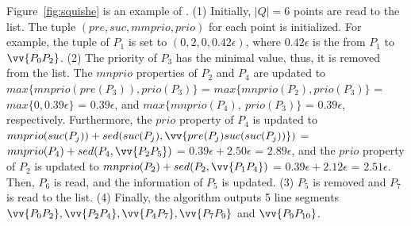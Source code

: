 \begin{example}
\label{exm-alg-squishe}
Figure~\ref{fig:squishe} is an example of \squishe.
%
(1) Initially, $|Q| = 6$ points are read to the list. The tuple $(pre, suc, mmprio, prio)$ for each point is initialized. For example, the tuple of $P_1$ is set to $(0, 2, 0, 0.42\epsilon)$, where $0.42\epsilon$ is the \sed from $P_1$ to $\vv{P_0P_2}$.
%
(2) The priority of $P_3$ has the minimal value, thus, it is removed from the list.
The $mnprio$ properties of $P_2$ and $P_4$ are updated to $max\{mnprio(pre(P_3)), prio(P_3)\}$ = $max\{mnprio(P_2), prio(P_3)\}$ = $max\{0, 0.39\epsilon\}$ = $0.39\epsilon$, and $max\{mnprio(P_4), ~prio(P_3)\}$ = $0.39\epsilon$, respectively.
Furthermore, the $prio$ property of $P_4$ is updated to $mnprio(suc(P_j)) + sed(suc(P_j),\vv{pre(P_{j})suc(suc(P_{j}))})$ = $mnprio(P_4) + sed(P_4,\vv{P_2P_5})$ = $0.39\epsilon + 2.50\epsilon$ = $2.89\epsilon$, and the $prio$ property of $P_2$ is updated to $mnprio(P_2) + sed(P_2,\vv{P_1P_4})$ = $0.39\epsilon + 2.12\epsilon$ = $2.51\epsilon$.
Then, $P_6$ is read, and the information of $P_5$ is updated.
%
(3) $P_5$ is removed and $P_7$ is read to the list.
%
(4) Finally, the algorithm outputs 5 line segments $\vv{P_0P_2},\vv{P_2P_4},\vv{P_4P_7},\vv{P_7P_9}$ and $\vv{P_9P_{10}}$.
\end{example}





